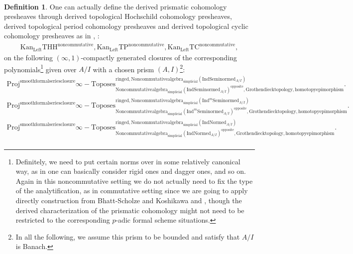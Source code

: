 \documentclass[11pt]{book}
\theoremstyle{definition}
\newtheorem{definition}[theorem]{Definition}
\numberwithin{equation}{section}
\begin{document}
\


\begin{definition}
\indent One can actually define the derived prismatic cohomology presheaves through derived topological Hochschild cohomology presheaves, derived topological period cohomology presheaves and derived topological cyclic cohomology presheaves as in \cite[Section 2.2, Section 2.3]{12BMS}, \cite[Theorem 1.13]{12BS}:
\begin{align}
	\mathrm{Kan}_{\mathrm{Left}}\mathrm{THH}^\mathrm{noncommutative},\mathrm{Kan}_{\mathrm{Left}}\mathrm{TP}^\mathrm{noncommutative},\mathrm{Kan}_{\mathrm{Left}}\mathrm{TC}^\mathrm{noncommutative},
\end{align}
on the following $(\infty,1)$-compactly generated closures of the corresponding polynomials\footnote{Definitely, we need to put certain norms over in some relatively canonical way, as in \cite[Section 4.2]{BBM} one can basically consider rigid ones and dagger ones, and so on. Again in this noncommutative setting we do not actually need to fix the type of the analytification, as in commutative setting since we are going to apply directly construction from Bhatt-Scholze and Koshikawa \cite{12BS} and \cite{12Ko1}, though the derived characterization of the prismatic cohomology might not need to be restricted to the corresponding $p$-adic formal scheme situations.} given over $A/I$ with a chosen prism $(A,I)$\footnote{In all the following, we assume this prism to be bounded and satisfy that $A/I$ is Banach.}:
\begin{align}
\mathrm{Proj}^\text{smoothformalseriesclosure}\infty-\mathrm{Toposes}^{\mathrm{ringed},\mathrm{Noncommutativealgebra}_{\mathrm{simplicial}}(\mathrm{Ind}\mathrm{Seminormed}_{A/I})}_{\mathrm{Noncommutativealgebra}_{\mathrm{simplicial}}(\mathrm{Ind}\mathrm{Seminormed}_{A/I})^\mathrm{opposite},\mathrm{Grothendiecktopology,homotopyepimorphism}}. \\
\mathrm{Proj}^\text{smoothformalseriesclosure}\infty-\mathrm{Toposes}^{\mathrm{ringed},\mathrm{Noncommutativealgebra}_{\mathrm{simplicial}}(\mathrm{Ind}^m\mathrm{Seminormed}_{A/I})}_{\mathrm{Noncommutativealgebra}_{\mathrm{simplicial}}(\mathrm{Ind}^m\mathrm{Seminormed}_{A/I})^\mathrm{opposite},\mathrm{Grothendiecktopology,homotopyepimorphism}}.\\
\mathrm{Proj}^\text{smoothformalseriesclosure}\infty-\mathrm{Toposes}^{\mathrm{ringed},\mathrm{Noncommutativealgebra}_{\mathrm{simplicial}}(\mathrm{Ind}\mathrm{Normed}_{A/I})}_{\mathrm{Noncommutativealgebra}_{\mathrm{simplicial}}(\mathrm{Ind}\mathrm{Normed}_{A/I})^\mathrm{opposite},\mathrm{Grothendiecktopology,homotopyepimorphism}}.\\

\end{align}
\end{definition}
\end{document}
